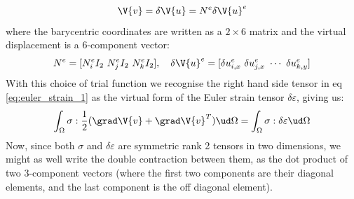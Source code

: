 \documentclass[sigconf]{acmart}
\begin{document}
\begin{equation*}
	\V{v} = \delta \V{u} = N^e \delta\V{u}^e
\end{equation*}
where the barycentric coordinates are written as a $ 2\times 6 $ matrix and the virtual displacement is a 6-component vector:
\begin{equation*}
	N^e = [N_i^e I_2\ N_j^e I_2\ N_k^e I_2], \quad \delta \V{u}^e = [\delta u^e_{i,x} \ \delta u^e_{j,x} \ \cdots \ \delta u^e_{k,y}]
\end{equation*}
With this choice of trial function we recognise the right hand side tensor in eq \ref{eq:euler_strain_1} as the virtual form of the Euler strain tensor $ \delta \varepsilon $, giving us:
\begin{equation*}
	\int_{\Omega} \sigma : \frac{1}{2} (\grad \V{v} + \grad \V{v}^T) \ud \Omega = \int_{\Omega} \sigma : \delta \varepsilon \ud \Omega
\end{equation*}
Now, since both $ \sigma  $ and $ \delta \varepsilon $ are symmetric rank 2 tensors in two dimensions, we might as well write the double contraction between them, as the dot product of two 3-component vectors (where the first two components are their diagonal elements, and the last component is the off diagonal element).
\end{document}
